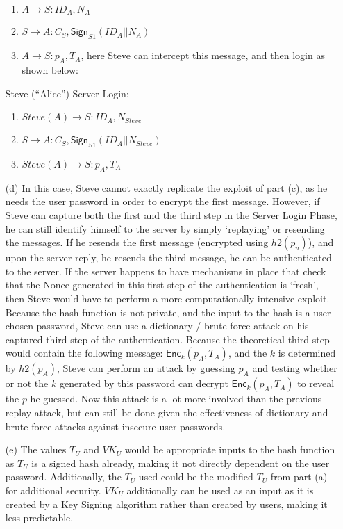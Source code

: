 \documentclass[11pt]{article}
\begin{document}
\begin{itemize}
    \begin{enumerate}
      \item $A \longrightarrow S : ID_A, N_A$
      \item $S \longrightarrow A: C_S, \mathsf{Sign}_{S1}(ID_A || N_A)$
      \item $A \longrightarrow S: p_A, T_A$, here Steve can intercept this message, and 
        then login as shown below:
    \end{enumerate}
    Steve (``Alice'') Server Login:
    \begin{enumerate}
      \item $Steve(A) \longrightarrow S : ID_A, N_{Steve}$
      \item $S \longrightarrow A: C_S, \mathsf{Sign}_{S1}(ID_A || N_{Steve})$
      \item $Steve(A) \longrightarrow S: p_A, T_A$
    \end{enumerate}
  \item[(d)]
    In this case, Steve cannot exactly replicate the exploit of part (c), as he needs the user 
    password in order to encrypt the first message. However, if Steve can capture both the first 
    and the third step in the Server Login Phase, he can still identify himself to the server by 
    simply `replaying' or resending the messages. If he resends the first message (encrypted using
    $h2(p_u)$), and upon the server reply, he resends the third message, he can be authenticated 
    to the server. If the server happens to have mechanisms in place that check that the Nonce 
    generated in this first step of the authentication is `fresh', then Steve would have to 
    perform a more computationally intensive exploit. Because the hash function is not private, 
    and the input to the hash is a user-chosen password, Steve can use a dictionary / brute force
    attack on his captured third step of the authentication. Because the theoretical third step 
    would contain the following message: $\mathsf{Enc}_k(p_A, T_A)$, and the $k$ is determined by
    $h2(p_A)$, Steve can perform an attack by guessing $p_A$ and testing whether or not the $k$ 
    generated by this password can decrypt $\mathsf{Enc}_k(p_A, T_A)$ to reveal the $p$ he guessed.
    Now this attack is a lot more involved than the previous replay attack, but can still be done
    given the effectiveness of dictionary and brute force attacks against insecure user passwords.
  \item[(e)]
    The values $T_U$ and $VK_U$ would be appropriate inputs to the hash function as $T_U$
    is a signed hash already, making it not directly dependent on the user password. Additionally, 
    the $T_U$ used could be the modified $T_U$ from part (a) for additional security. $VK_U$ 
    additionally can be used as an input as it is created by a Key Signing algorithm rather than
    created by users, making it less predictable.
\end{itemize}
\end{document}
